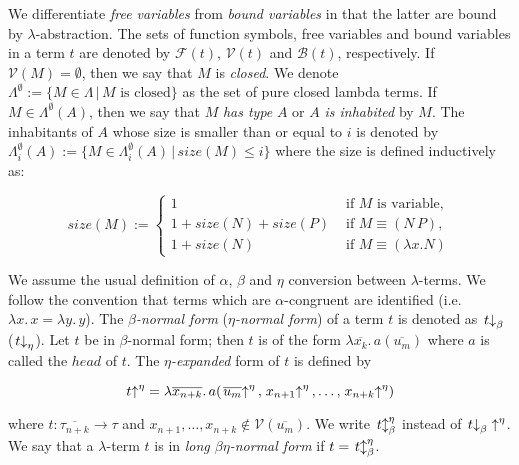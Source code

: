 We differentiate {\em free variables} from {\em bound variables} in that the latter are bound by $\lambda$-abstraction. The sets of function symbols, free variables and bound variables in a term $t$ are denoted by $\mathcal{F}(t)$, $\mathcal{V}(t)$ and $\mathcal{B}(t)$, respectively. If $\mathcal{V}(M)=\emptyset$, then we say that $M$ is {\em closed}. We denote $\Lambda^{\emptyset} := \{M\in\Lambda\,|\,M\textrm{ is closed}\}$ as the set of pure closed lambda terms. If $M\in\Lambda^{\emptyset}(A)$, then we say that $M$ {\em has type} $A$ or $A$ {\em is inhabited} by $M$. The inhabitants of $A$ whose size is smaller than or equal to $i$ is denoted by $\Lambda_i^{\emptyset}(A):=\{M \in \Lambda_i^{\emptyset}(A)\,|\,size(M)\le i\}$ where the size is defined inductively as:

$$
size(M) := \left\{
  \begin{array}{ll}
    1 & \textrm{   if } M \textrm{ is variable,}\\
    1 + size(N) + size(P) & \textrm{  if } M \equiv (N\,P),\\
    1 + size(N) & \textrm{   if } M \equiv (\lambda x. N)
  \end{array}\right.
$$

We assume the usual definition of $\alpha$, $\beta$ and $\eta$ conversion between $\lambda$-terms. We follow the convention that terms which are $\alpha$-congruent are identified (i.e. $\lambda x.\,x=\lambda y.\,y$). The {\em $\beta$-normal form} ({\em $\eta$-normal form}) of a term $t$ is denoted as $\left. t \right\downarrow_\beta$ ($\left. t \right\downarrow_\eta$). Let $t$ be in $\beta$-normal form; then $t$ is of the form $\lambda \overline{x_k}.\,a(\overline{u_m})$ where $a$ is called the $head$ of $t$. The {\em $\eta$-expanded} form of $t$ is defined by 

\begin{displaymath}
\left. t \right\uparrow^{\eta} = \lambda \overline{x_{n+k}}.\, a(\left. \overline{u_m} \right\uparrow^{\eta}, \left. x_{n+1} \right\uparrow^{\eta}, \ldots, \left. x_{n+k} \right\uparrow^{\eta})
\end{displaymath}

\noindent where $t : \overline{\tau_{n+k}} \to \tau$ and $x_{n+1},\ldots,x_{n+k} \notin \mathcal{V}(\overline{u_m})$. We write $\left. t \right\updownarrow^{\eta}_{\beta}$ instead of $\left. t \right\downarrow_\beta\left.  \right\uparrow^{\eta}$. We say that a $\lambda$-term $t$ is in {\em long $\beta\eta$-normal form} if $t = \left. t \right\updownarrow^{\eta}_{\beta}$.


